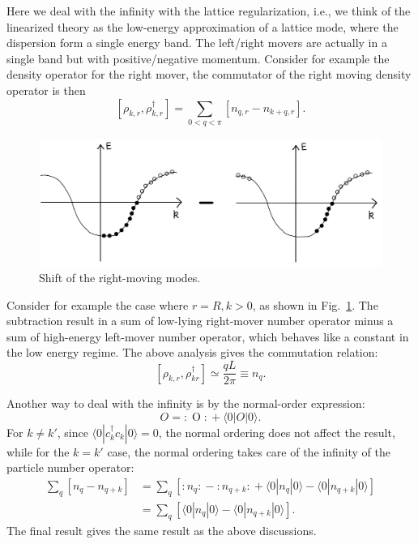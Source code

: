 Here we deal with the infinity with the lattice regularization, i.e., we think of the linearized theory as the low-energy approximation of a lattice mode, where the dispersion form a single energy band.
The left/right movers are actually in a single band but with positive/negative momentum.
Consider for example the density operator for the right mover, the commutator of the right moving density operator is then
\begin{equation}
	\left[\rho_{k,r}, \rho_{k,r}^\dagger \right] = \sum_{0<q<\pi} [n_{q,r}-n_{k+q,r}].
\end{equation}

\begin{figure}
	\centering
	\includegraphics[width=0.5\linewidth]{pics/BS-k-shift}
	\caption{Shift of the right-moving modes.}
	\label{fig:bs-k-shift}
\end{figure}

Consider for example the case where $r=R,k>0$, as shown in Fig.~\ref{fig:bs-k-shift}.
The subtraction result in a sum of low-lying right-mover number operator minus a sum of high-energy left-mover number operator, which behaves like a constant in the low energy regime. 
The above analysis gives the commutation relation:
\begin{equation}
	\left[\rho_{k,r}, \rho_{kr}^\dagger \right] \simeq \frac{qL}{2\pi} \equiv n_q.
\end{equation}

Another way to deal with the infinity is by the normal-order expression:
\begin{equation}
	O = {:\mathrel{O}:} + \langle 0|O|0\rangle.
\end{equation}
For $k\ne k'$, since $\langle 0|c_k^\dagger c_k|0\rangle=0$, the normal ordering does not affect the result, while for the $k=k'$ case, the normal ordering takes care of the infinity of the particle number operator:
\begin{equation}
\begin{aligned}
	\sum_q [n_{q} - n_{q+k}]
	&= \sum_q \left[{:\mathrel{n_{q}}:} - {:\mathrel{n_{q+k}}:} 
		+ \langle0|n_{q}|0\rangle -\langle0|n_{q+k}|0\rangle \right] \\
	&= \sum_q [\langle0|n_{q}|0\rangle -\langle0|n_{q+k}|0\rangle].
\end{aligned}
\end{equation}
The final result gives the same result as the above discussions.

